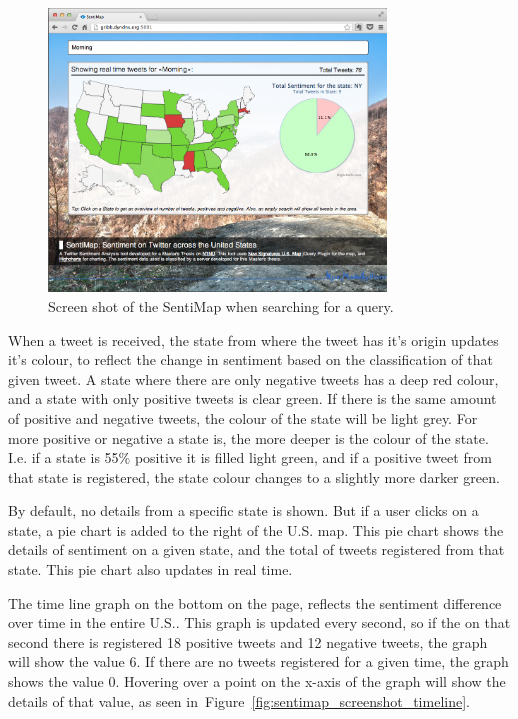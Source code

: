 \begin{figure}[htb!]
\begin{center}
 \includegraphics[width=0.8\textwidth]{../img/sentimap_screenshot_search.png}
 \caption{Screen shot of the SentiMap when searching for a query.}
 \label{fig:sentimap_screenshot_search}
\end{center}
\end{figure}

When a tweet is received, the state from where the tweet has it's origin updates it's colour, to reflect the change in sentiment based on the classification of that given tweet. A state where there are only negative tweets has a deep red colour, and a state with only positive tweets is clear green. If there is the same amount of positive and negative tweets, the colour of the state will be light grey. For more positive or negative a state is, the more deeper is the colour of the state. I.e. if a state is 55\% positive it is filled light green, and if a positive tweet from that state is registered, the state colour changes to a slightly more darker green.

By default, no details from a specific state is shown. But if a user clicks on a state, a pie chart is added to the right of the U.S. map. This pie chart shows the details of sentiment on a given state, and the total of tweets registered from that state. This pie chart also updates in real time.

The time line graph on the bottom on the page, reflects the sentiment difference over time in the entire U.S.. This graph is updated every second, so if the on that second there is registered 18 positive tweets and 12 negative tweets, the graph will show the value 6. If there are no tweets registered for a given time, the graph shows the value 0. Hovering over a point on the x-axis of the graph will show the details of that value, as seen in~Figure~\ref{fig:sentimap_screenshot_timeline}.


